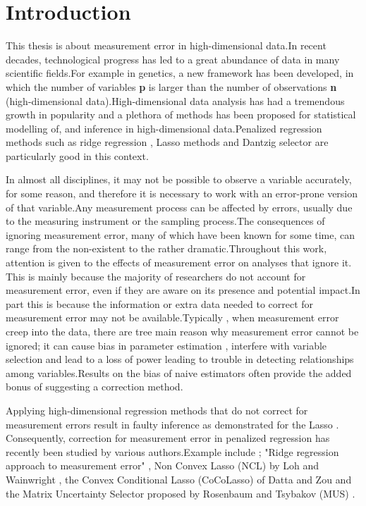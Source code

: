 \documentclass[12pt]{report}
\begin{document}
	\tableofcontents
	\listoffigures
	\listoftables
	\chapter*{Introduction}
	This thesis is about measurement error in high-dimensional data.In recent decades, technological progress has led to a great abundance of data in many scientific fields.For example in genetics, a new framework has been developed, in which the number of variables \textbf{p} is larger than the number of observations \textbf{n} (high-dimensional data).High-dimensional data analysis has had a tremendous growth in popularity and a plethora of methods has been proposed for statistical modelling of, and inference in high-dimensional data.Penalized regression methods such as ridge regression \cite{nref8}, Lasso \cite{nref9} methods and Dantzig selector \cite{nref12} are particularly good in this context.
	
	In almost all disciplines, it may not be possible to observe a variable accurately, for some reason, and therefore it is necessary to work with an error-prone version of that variable.Any measurement process can be affected by errors, usually due to the measuring instrument or the sampling process.The consequences of ignoring measurement error, many of which have been known for some time, can range from the non-existent to the rather dramatic.Throughout this work, attention is given to the effects of measurement error on analyses that ignore it. This is mainly because the majority of researchers do not account for measurement error, even if they are aware on its presence  and potential impact.In part this is because the information or extra data needed to correct for measurement error may not be available.Typically , when measurement error creep into the data, there are tree main reason why measurement error cannot be ignored; it can cause bias in parameter estimation \cite{nref1}, interfere with variable selection \cite{nref17} and lead to a loss of power \cite{nref11} leading to trouble in detecting relationships among variables.Results on the bias of naive estimators often provide the added bonus of suggesting a correction method.
	
	Applying high-dimensional regression methods that do not correct for measurement errors result in faulty inference as demonstrated for the Lasso \cite{nref6}. Consequently, correction for measurement error in penalized regression has recently been studied by various authors.Example include ; "Ridge regression approach to measurement error"\cite{nref6} , Non Convex Lasso (NCL) by Loh and Wainwright \cite{nref17}, the Convex Conditional Lasso (CoCoLasso) of Datta and Zou \cite{nref18} and the Matrix Uncertainty Selector proposed by Rosenbaum and Tsybakov (MUS) \cite{nref23}.
	
\end{document}

